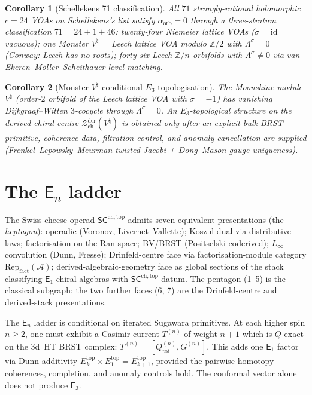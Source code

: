 \documentclass[11pt]{article}
\providecommand{\cA}{\mathcal{A}}
\providecommand{\cZ}{\mathcal{Z}}
\providecommand{\bZ}{\mathbb{Z}}
\providecommand{\Eone}{\mathsf{E}_{1}}
\providecommand{\Ethree}{\mathsf{E}_{3}}
\providecommand{\En}{\mathsf{E}_{n}}
\providecommand{\SCchtop}{\mathsf{SC}^{\mathrm{ch,top}}}
\newtheorem*{corollary}{Corollary}
\begin{document}
\begin{corollary}[Schellekens 71 classification]
All $71$ strongly-rational holomorphic $c=24$ VOAs on Schellekens's
list satisfy $\alpha_{\mathrm{orb}} = 0$ through a three-stratum
classification $71 = 24 + 1 + 46$: twenty-four Niemeier lattice VOAs
\textup{(}$\sigma=\mathrm{id}$ vacuous\textup{)}; one Monster
$V^{\natural}$ = Leech lattice VOA modulo $\bZ/2$ with
$\Lambda^{\sigma} = 0$ \textup{(}Conway: Leech has no roots\textup{)};
forty-six Leech $\bZ/n$ orbifolds with
$\Lambda^{\sigma}\ne 0$ via van Ekeren--M\"oller--Scheithauer
level-matching.
\end{corollary}

\begin{corollary}[Monster $V^{\natural}$ conditional $E_3$-topologisation]
The Moonshine module $V^{\natural}$ \textup{(}order-$2$ orbifold of
the Leech lattice VOA with $\sigma=-1$\textup{)} has vanishing
Dijkgraaf--Witten $3$-cocycle through $\Lambda^{\sigma}=0$. An
$E_3$-topological structure on the derived chiral centre
$\cZ^{\mathrm{der}}_{\mathrm{ch}}(V^{\natural})$ is obtained only after
an explicit bulk BRST primitive, coherence data, filtration control,
and anomaly cancellation are supplied
\textup{(}Frenkel--Lepowsky--Meurman twisted Jacobi + Dong--Mason
gauge uniqueness\textup{)}.
\end{corollary}

\section{The $\En$ ladder}

\noindent
The Swiss-cheese operad $\SCchtop$ admits seven equivalent
presentations \textup{(}the \emph{heptagon}\textup{)}: operadic
(Voronov, Livernet--Vallette); Koszul dual via distributive laws;
factorisation on the Ran space; BV/BRST (Positselski coderived);
$L_\infty$-convolution (Dunn, Fresse); Drinfeld-centre face via
factorisation-module category $\mathrm{Rep}_{\mathrm{fact}}(\cA)$;
derived-algebraic-geometry face as global sections of the stack
classifying $\Eone$-chiral algebras with $\SCchtop$-datum. The
pentagon \textup{(}1--5\textup{)} is the classical subgraph; the two
further faces \textup{(}6, 7\textup{)} are the Drinfeld-centre and
derived-stack presentations.

The $\En$ ladder is conditional on iterated Sugawara primitives. At
each higher spin $n\ge 2$, one must exhibit a Casimir current
$T^{(n)}$ of weight $n+1$ which is $Q$-exact on the 3d~HT BRST complex:
$T^{(n)} = [Q_{\mathrm{tot}}^{(n)}, G^{(n)}]$. This adds one $\Eone$
factor via Dunn additivity $E_k^{\mathrm{top}}\times
E_1^{\mathrm{top}} = E_{k+1}^{\mathrm{top}}$, provided the pairwise
homotopy coherences, completion, and anomaly controls hold. The
conformal vector alone does not produce $\Ethree$.
\end{document}
